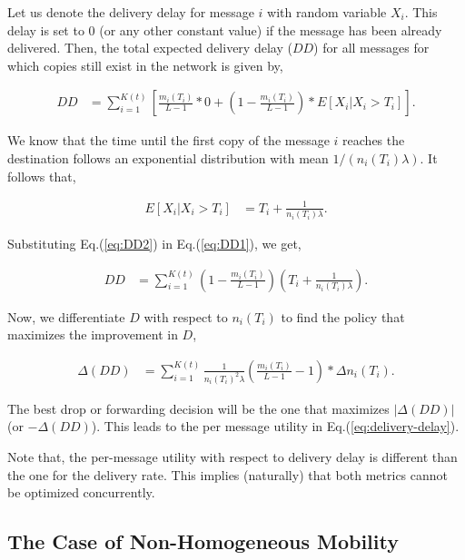 Let us denote the delivery delay for message $i$ with random variable $X_i$. This delay is set to $0$ (or any other constant value) if the message has been already delivered. Then, the total expected delivery delay ($DD$) for all messages for which copies still exist in the network is given by,

\small
\begin{align}\label{eq:DD1}
DD & = \sum_{i=1}^{K(t)} \left[\frac{m_i(T_i)}{L-1}*0 + (1 - \frac{m_i(T_i)}{L-1}) * E[X_i | X_i
> T_i]\right].
\end{align}
\normalsize

We know that the time until the first copy of the message $i$ reaches the destination follows an exponential distribution with mean $1/(n_i(T_i)
\lambda)$. It follows that,

\begin{align}\label{eq:DD2}
E[X_i | X_i
> T_i] &= T_i + \frac{1}{n_i(T_i) \lambda}.
\end{align}

Substituting Eq.(\ref{eq:DD2}) in Eq.(\ref{eq:DD1}), we get,

\begin{align*}
DD &= \sum_{i=1}^{K(t)} (1 - \frac{m_i(T_i)}{L-1})(T_i + \frac{1}{n_i(T_i)
\lambda}).
\end{align*}

Now, we differentiate $D$ with respect to $n_i(T_i)$ to find the policy that maximizes the improvement in $D$,

\begin{align*}
\Delta(DD) &= \sum_{i=1}^{K(t)}{\frac{1}{n_i(T_i)^2 \lambda} ( \frac{m_i(T_i)}{L-1}-1)* \Delta n_i(T_i)}.
\end{align*}

The best drop or forwarding decision will be the one that maximizes $\vert\Delta(DD)\vert$ (or $-\Delta(DD)$). This leads to the per message utility in Eq.(\ref{eq:delivery-delay}).


Note that, the per-message utility with respect to delivery delay is different than the one for the delivery rate. This implies (naturally) that both metrics cannot be optimized concurrently.

\subsection{The Case of Non-Homogeneous Mobility}
\label{section:heterogeneous-mobility}


